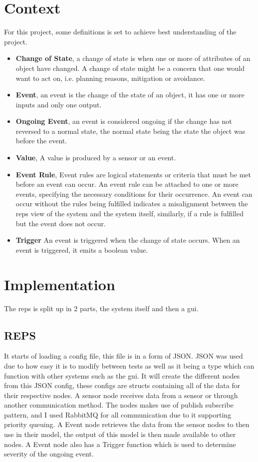 \documentclass[conference]{IEEEtran}
\begin{document}
	\section{Context}
		For this project, some definitions is set to achieve best understanding of the project.
		\begin{itemize}
			\item \textbf{Change of State}, a change of state is when one or more of attributes of an object have changed. A change of state might be a concern that one would want to act on, i.e. planning reasons, mitigation or avoidance.
			\item \textbf{Event}, an event is the change of the state of an object, it has one or more inputs and  only one output.
			\item \textbf{Ongoing Event}, an event is considered ongoing if the change has not reversed to a normal state, the normal state being the state the object was before the event.
			\item \textbf{Value}, A value is produced by a sensor or an event.
			\item \textbf{Event Rule}, Event rules are logical statements or criteria that must be met before an event can occur. An event rule can be attached to one or more events, specifying the necessary conditions for their occurrence. An event can occur without the rules being fulfilled indicates a misalignment between the \gls{reps} view of the system and the system itself, similarly, if a rule is fulfilled but the event does not occur.
			\item \textbf{Trigger} An event is triggered when the change of state occurs. When an event is triggered, it emits a boolean value.
		\end{itemize}
		
	\section{Implementation}
		The \gls{reps} is split up in 2 parts, the system itself and then a \gls{gui}. 
		\subsection{REPS}\label{Reps:Imp}
			It starts of loading a config file, this file is in a form of JSON. JSON was used due to how easy it is to modify between tests as well as it being a type which can function with other systems such as the \gls{gui}. It will create the different nodes from this JSON config, these configs are structs containing all of the data for their respective nodes. A sensor node receives data from a sensor or through another communication method. The nodes makes use of publish subscribe pattern, and I used RabbitMQ for all communication due to it supporting priority queuing. A Event node retrieves the data from the sensor nodes to then use in their model, the output of this model is then made available to other nodes. A Event node also has a Trigger function which is used to determine severity of the ongoing event.
			
\end{document}

